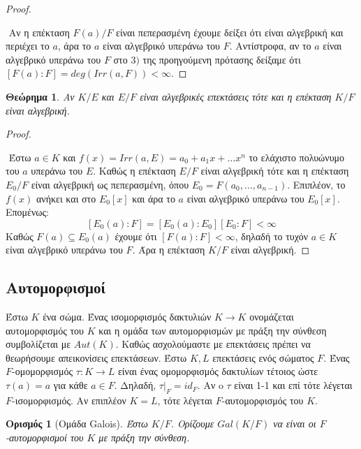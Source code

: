 \documentclass[oneside,a4paper]{article}
\newtheorem{theorem}{Θεώρημα}
\newtheorem*{defn}{Ορισμός}
\newcommand {\tl}{\textlatin}
\begin{document}
\begin{proof} $ $
	
	$ $\newline
	Αν η επέκταση $F(a)/F$ είναι πεπερασμένη έχουμε δείξει ότι είναι αλγεβρική και περιέχει το $a$, άρα το $a$ είναι αλγεβρικό υπεράνω του $F$. Αντίστροφα, αν το $a$ είναι αλγεβρικό υπεράνω του $F$ στο $3)$ της προηγούμενη πρότασης δείξαμε ότι $[F(a) : F] = deg(Irr(a,F)) < \infty$. 

\end{proof}


\begin{theorem}Αν $K/E$ και $E/F$ είναι αλγεβρικές επεκτάσεις τότε και η επέκταση $K/F$ είναι αλγεβρική.
\end{theorem}

\begin{proof} $ $

	$ $\newline
	Έστω $a \in K$ και $f(x) = Irr(a,E) = a_0 + a_1 x + \ldots x^n$ το ελάχιστο πολυώνυμο του $a$ υπεράνω του $E$. Καθώς η επέκταση $E/F$ είναι αλγεβρική τότε και η επέκταση $E_0 /F$ είναι αλγεβρική ως πεπερασμένη, όπου $E_0 = F(a_0,\ldots, a_{n-1})$. Επιπλέον, το $f(x)$ ανήκει και στο $E_0 [x]$ και άρα το $a$ είναι αλγεβρικό υπεράνω του $E_0 [x]$. Επομένως:
	$$[E_0 (a) : F] = [E_0 (a) : E_0] [E_0 : F] < \infty$$
	Καθώς $F(a) \subseteq E_0 (a)$ έχουμε ότι $[F(a) :F] < \infty $, δηλαδή το τυχόν $a \in K$ είναι αλγεβρικό υπεράνω του $F$. Άρα η επέκταση $K/F$ είναι αλγεβρική.
\end{proof}

\subsection{Αυτομορφισμοί}
\vspace{1cm}

Έστω $K$ ένα σώμα. Ένας ισομορφισμός δακτυλιών $K \rightarrow K$ ονομάζεται αυτομορφισμός του $K$ και η ομάδα των αυτομορφισμών με πράξη την σύνθεση συμβολίζεται με $Aut(K)$. Καθώς ασχολούμαστε με επεκτάσεις πρέπει να θεωρήσουμε απεικονίσεις επεκτάσεων. Έστω $K,L$ επεκτάσεις ενός σώματος $F$. Ένας $F$-ομομορφισμός $\tau : K \rightarrow L$ είναι ένας ομομορφισμός δακτυλίων τέτοιος ώστε $\tau (a) = a$ για κάθε $a \in F$. Δηλαδή, $\tau |_F = id_F$. Αν o $\tau$ είναι 1-1 και επί τότε λέγεται $F$-ισομορφισμός. Αν επιπλέον $K=L$, τότε λέγεται $F$-αυτομορφισμός του $K$.

\begin{defn}[Ομάδα \tl{Galois}]
	Έστω $K/F$. Ορίζουμε $Gal(K/F)$ να είναι οι $F$-αυτομορφισμοί του $K$ με πράξη την σύνθεση.
\end{defn}
\end{document}
